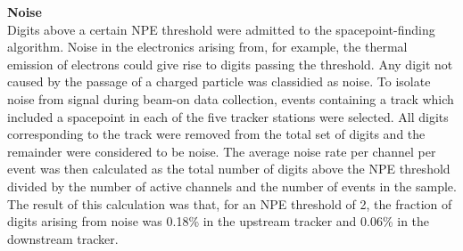 \noindent\textbf{Noise}\\
\noindent
Digits above a certain NPE threshold were admitted to the
spacepoint-finding algorithm.
Noise in the electronics arising from, for example, the thermal
emission of electrons could give rise to digits passing the threshold.
Any digit not caused by the passage of a charged particle was
classidied as noise.
To isolate noise from signal during beam-on data collection, events
containing a track which included a spacepoint in each of the five
tracker stations were selected.
All digits corresponding to the track were removed from the total set
of digits and the remainder were considered to be noise.
The average noise rate per channel per event was then calculated as
the total number of digits above the NPE threshold divided by the
number of active channels and the  number of events in the sample.
The result of this calculation was that, for an NPE threshold of 2,
the fraction of digits arising from noise was 0.18\% in the upstream
tracker and 0.06\% in the downstream tracker. \\

